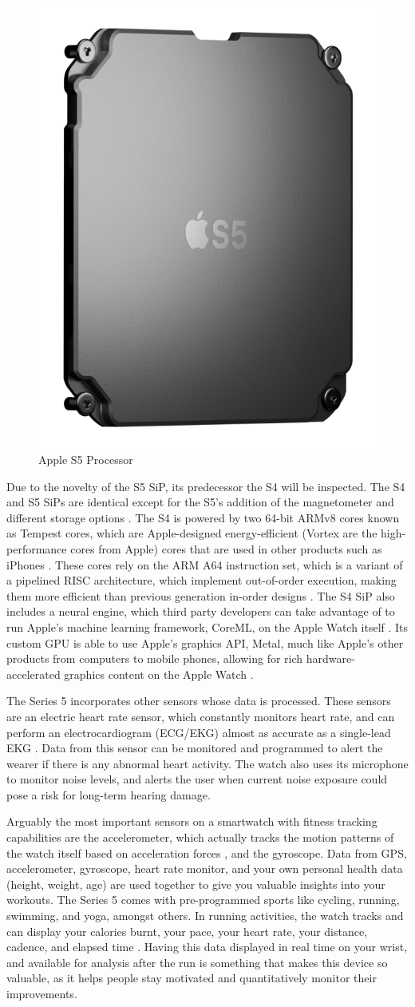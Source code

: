 \begin{figure}[h]
    \centering
    \includegraphics[width=.15\linewidth]{media/apple_s5_chip.png}
    \caption{Apple S5 Processor \cite{apple_s5_pic}}
    \label{fig:s5chip}
\end{figure}

Due to the novelty of the S5 SiP, its predecessor the S4 will be inspected. The S4 and
S5 SiPs are identical except for the S5's addition of the magnetometer and different
storage options \cite{s5vss4}. The S4 is powered by two 64-bit ARMv8 cores known as Tempest
cores, which are Apple-designed energy-efficient (Vortex are the high-performance cores from Apple)
cores that are used in other products such as iPhones \cite{s4_cores}.
These cores rely on the ARM A64 instruction set, which is a variant of a pipelined RISC 
architecture, which implement out-of-order execution, making them more efficient
than previous generation in-order designs \cite{arm_risc}. The S4 SiP also includes a
neural engine, which third party developers can take advantage of to run Apple's machine
learning framework, CoreML, on the Apple Watch itself \cite{core_ml}. Its custom GPU
is able to use Apple's graphics API, Metal, much like Apple's other products from computers
to mobile phones, allowing for rich hardware-accelerated graphics content on the 
Apple Watch \cite{watch_metal}.

The Series 5 incorporates other sensors whose data is processed. These sensors are an electric
heart rate sensor, which constantly monitors heart rate, and can perform an electrocardiogram 
(ECG/EKG) almost as accurate as a single-lead EKG \cite{apple_health}. Data from this sensor can
be monitored and programmed to alert the wearer if there is any abnormal heart activity. The watch
also uses its microphone to monitor noise levels, and alerts the user when current noise exposure could
pose a risk for long-term hearing damage. 

Arguably the most important sensors on a smartwatch with fitness tracking capabilities are the accelerometer,
which actually tracks the motion patterns of the watch itself based on acceleration forces \cite{accel_expl},
and the gyroscope. Data from GPS, accelerometer, gyroscope, heart rate monitor, and your own personal 
health data (height, weight, age) are
used together to give you valuable insights into your workouts. The Series 5 comes with pre-programmed
sports like cycling, running, swimming, and yoga, amongst others. In running activities, the watch
tracks and can display your calories burnt, your pace, your heart rate, your distance, cadence, and
elapsed time \cite{apple_fitness}. Having this data displayed in real time on your wrist, and available for analysis after the
run is something that makes this device so valuable, as it helps people stay motivated and quantitatively
monitor their improvements.

